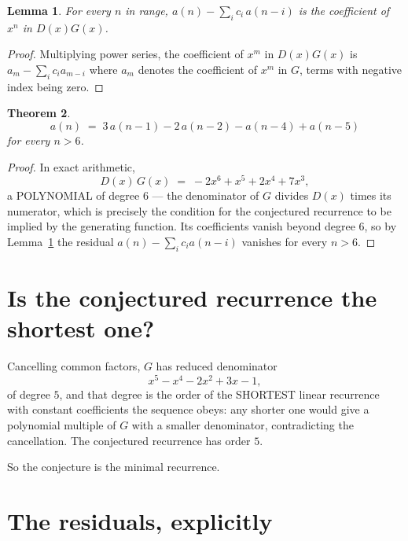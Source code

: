 \documentclass[11pt,a4paper]{article}
\theoremstyle{plain}
\newtheorem{theorem}{Theorem}
\newtheorem{lemma}[theorem]{Lemma}
\theoremstyle{definition}
\begin{document}
\begin{lemma}\label{lem:key}
For every $n$ in range, $a(n)-\sum_i c_i\,a(n-i)$ is the coefficient of $x^{n}$ in
$D(x)G(x)$.
\end{lemma}

\begin{proof}
Multiplying power series, the coefficient of $x^{m}$ in $D(x)G(x)$ is
$a_m-\sum_i c_i a_{m-i}$ where $a_m$ denotes the coefficient of $x^{m}$ in $G$, terms with
negative index being zero.
\end{proof}

\begin{theorem}
\[
a(n)\;=\;3\,a(n-1) - 2\,a(n-2) - a(n-4) + a(n-5)
\]
for every $n>6$.
\end{theorem}

\begin{proof}
In exact arithmetic,
\[
D(x)\,G(x)\;=\;- 2 x^{6} + x^{5} + 2 x^{4} + 7 x^{3},
\]
a POLYNOMIAL of degree $6$ --- the denominator of $G$ divides $D(x)$ times its numerator,
which is precisely the condition for the conjectured recurrence to be implied by the
generating function. Its coefficients vanish beyond degree $6$, so by
Lemma~\ref{lem:key} the residual $a(n)-\sum_ic_ia(n-i)$ vanishes for every
$n>6$.
\end{proof}

\section{Is the conjectured recurrence the shortest one?}

Cancelling common factors, $G$ has reduced denominator
\[
x^{5} - x^{4} - 2 x^{2} + 3 x - 1,
\]
of degree $5$, and that degree is the order of the SHORTEST linear recurrence with
constant coefficients the sequence obeys: any shorter one would give a polynomial multiple of
$G$ with a smaller denominator, contradicting the cancellation. The conjectured recurrence has
order $5$.

So the conjecture is the minimal recurrence.

\section{The residuals, explicitly}
\end{document}

